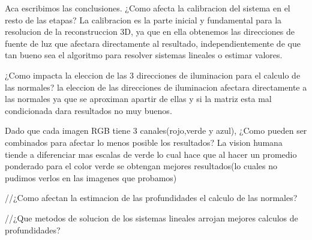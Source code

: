 Aca escribimos las conclusiones.
¿Como afecta la calibracion del sistema en el resto de las etapas?
La calibracion es la parte inicial y fundamental para la resolucion de la reconstruccion 3D, ya que en ella obtenemos las direcciones de fuente de luz que afectara directamente al resultado, independientemente de que tan bueno sea el algoritmo para resolver sistemas lineales o estimar valores.

¿Como impacta la eleccion de las 3 direcciones de iluminacion para el calculo de las normales?
la eleccion de las direcciones de iluminacion afectara directamente a las normales ya que se aproximan apartir de ellas y si la matriz esta mal condicionada dara resultados no muy buenos.

Dado que cada imagen RGB tiene 3 canales(rojo,verde y azul), ¿Como pueden ser combinados para afectar lo menos posible los resultados?
La vision humana tiende a diferenciar mas escalas de verde lo cual hace que al hacer un promedio ponderado para el color verde se obtengan mejores resultados(lo cuales no pudimos verlos en las imagenes que probamos)

//¿Como afectan la estimacion de las profundidades el calculo de las normales?


//¿Que metodos de solucion de los sistemas lineales arrojan mejores calculos de profundidades?
